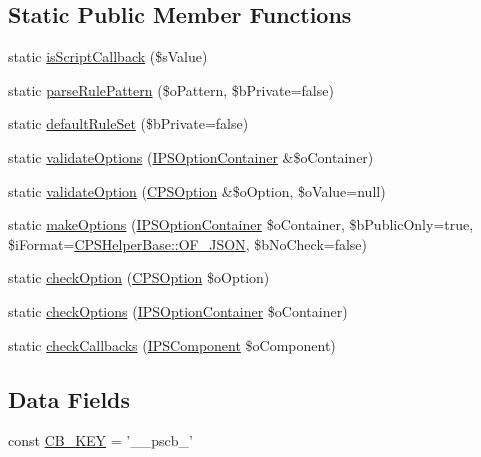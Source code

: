 \subsection*{Static Public Member Functions}
\begin{DoxyCompactItemize}
\item 
static \hyperlink{classCPSOptionHelper_a015734d78f16cca14cad5df110e13715}{isScriptCallback} (\$sValue)
\item 
static \hyperlink{classCPSOptionHelper_af245193a05c6d9de1d9fec6239b9b14b}{parseRulePattern} (\$oPattern, \$bPrivate=false)
\item 
static \hyperlink{classCPSOptionHelper_aa50035c5f1b103bc39bb60b4a1be1dae}{defaultRuleSet} (\$bPrivate=false)
\item 
static \hyperlink{classCPSOptionHelper_a1196dfb53b5a9c5b1865efd2678c0bb5}{validateOptions} (\hyperlink{interfaceIPSOptionContainer}{IPSOptionContainer} \&\$oContainer)
\item 
static \hyperlink{classCPSOptionHelper_af1ecea04b9292bde2418a4608ed30197}{validateOption} (\hyperlink{classCPSOption}{CPSOption} \&\$oOption, \$oValue=null)
\item 
static \hyperlink{classCPSOptionHelper_a40877d061316ed1f0bca467b4e86a1b5}{makeOptions} (\hyperlink{interfaceIPSOptionContainer}{IPSOptionContainer} \$oContainer, \$bPublicOnly=true, \$iFormat=\hyperlink{classCPSHelperBase_ae216f8dc124162fce9c831581cccad38}{CPSHelperBase::OF\_\-JSON}, \$bNoCheck=false)
\item 
static \hyperlink{classCPSOptionHelper_aea8660a7b4f4ad32037ce9660855bfec}{checkOption} (\hyperlink{classCPSOption}{CPSOption} \$oOption)
\item 
static \hyperlink{classCPSOptionHelper_a9a9fdad1deff93bf05246049e7c06869}{checkOptions} (\hyperlink{interfaceIPSOptionContainer}{IPSOptionContainer} \$oContainer)
\item 
static \hyperlink{classCPSOptionHelper_a82708c833182535dc89664ea66c54f1a}{checkCallbacks} (\hyperlink{interfaceIPSComponent}{IPSComponent} \$oComponent)
\end{DoxyCompactItemize}
\subsection*{Data Fields}
\begin{DoxyCompactItemize}
\item 
const \hyperlink{classCPSOptionHelper_a4652b705dc90fe7d967eecbf10901364}{CB\_\-KEY} = '\_\-\_\-pscb\_\-'
\end{DoxyCompactItemize}
